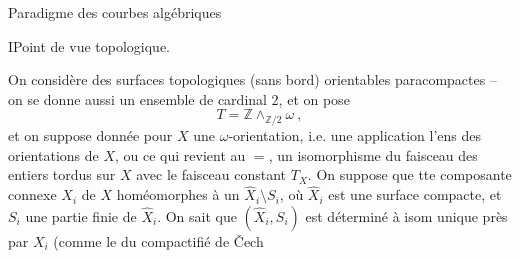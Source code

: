 Paradigme des courbes algébriques

I\quad Point de vue topologique.

On considère des surfaces topologiques (sans bord) orientables paracompactes  -- on se donne aussi un ensemble \inserted{$\omega$} de cardinal $2$, et on pose
\[
T=\mathbb Z\mathbin{\wedge}_{\mathbb Z/2}\omega\ ,
\]
et on suppose donnée pour $X$ une $\omega$-orientation, i.e. une application  l'ens des orientations de $X$, ou ce qui revient au $=$, un isomorphisme du faisceau des entiers tordus sur $X$ avec le faisceau constant $T_X$. On suppose que tte composante connexe $X_i$ de $X$  homéomorphes à un $\hat X_i\setminus S_i$, où $\hat X_i$ est une surface compacte, et $S_i$ une partie finie de $\hat X_i$. On sait que $(\hat X_i,S_i)$ est déterminé à isom unique près par $X_i$ (comme le  du compactifié de Čech
